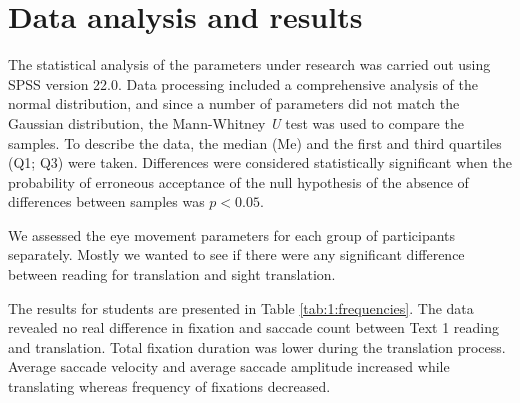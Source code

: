 \documentclass[output=paper]{langscibook}
\begin{document}
\section{Data analysis and results}
The statistical analysis of the parameters under research was carried out using SPSS version 22.0. Data processing included a comprehensive analysis of the normal distribution, and since a number of parameters did not match the Gaussian distribution, the Mann-Whitney \textit{U} test was used to compare the samples. To describe the data, the median (Me) and the first and third quartiles (Q1; Q3) were taken. Differences were considered statistically significant when the probability of erroneous acceptance of the null hypothesis of the absence of differences between samples was $p <0.05$.

We assessed the eye movement parameters for each group of participants separately. Mostly we wanted to see if there were any significant difference between reading for translation and sight translation.

The results for students are presented in Table \ref{tab:1:frequencies}. The data revealed no real difference in fixation and saccade count between Text 1 reading and translation. Total fixation duration was lower during the translation process. Average saccade velocity and average saccade amplitude increased while translating whereas frequency of fixations decreased.
\end{document}

